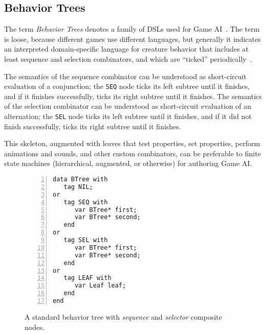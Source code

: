 \documentclass{acm_proc_article-sp}
\newcommand{\code}[1] {{\small{\texttt{#1}}}}
\begin{document}
\subsection{Behavior Trees}

The term \emph{Behavior Trees} denotes a family of DSLs used for Game 
AI~\cite{TODO}.
The term is loose, because different games use different languages,
but generally it indicates an interpreted domain-specific language
for creature behavior that includes at least sequence and selection combinators,
and which are ``ticked'' periodically~\cite{TODO}.


The semantics of the sequence combinator can be understood as short-circuit evaluation of a conjunction;
the \code{SEQ} node ticks its left subtree until it finishes,
and if it finishes successfully, ticks its right subtree until it finishes.
The semantics of the selection combinator can be understood as short-circuit evaluation of an alternation;
the \code{SEL} node ticks its left subtree until it finishes,
and if it did not finish successfully, ticks its right subtree until it finishes.

This skeleton, augmented with leaves that test properties, set properties, perform animations and sounds,
and other custom combinators, can be preferable to finite state machines (hierarchical, augmented, or otherwise) for authoring Game AI.

\begin{figure}%
\begin{lstlisting}[numbers=left,xleftmargin=3em]
data BTree with
   tag NIL;
or
   tag SEQ with
      var BTree* first;
      var BTree* second;
   end
or
   tag SEL with
      var BTree* first;
      var BTree* second;
   end
or
   tag LEAF with
      var Leaf leaf;
   end
end

\end{lstlisting}
\caption{ A standard behavior tree with \emph{sequence} and \emph{selector}
          composite nodes.
\label{lst.bt1}
}
\end{figure}
\end{document}

